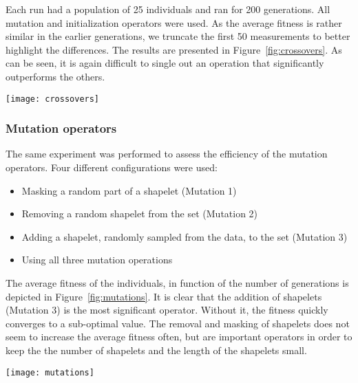 \documentclass[runningheads]{llncs}
\begin{document}
Each run had a population of 25 individuals and ran for 200 generations. All mutation and initialization operators were used. As the average fitness is rather similar in the earlier generations, we truncate the first 50 measurements to better highlight the differences. The results are presented in Figure~\ref{fig:crossovers}. As can be seen, it is again difficult to single out an operation that significantly outperforms the others.

\begin{figure*}
	\centering
	\texttt{[image: crossovers]}
	\caption{The fitness in function of the number of generations, for six datasets, using four different configurations of crossover operations.}
	\label{fig:crossovers}      
\end{figure*}

\subsubsection{Mutation operators}
The same experiment was performed to assess the efficiency of the mutation operators. Four different configurations were used:
\begin{itemize}
	\item Masking a random part of a shapelet (Mutation 1)
	\item Removing a random shapelet from the set (Mutation 2)
	\item Adding a shapelet, randomly sampled from the data, to the set (Mutation 3)
	\item Using all three mutation operations
\end{itemize}
The average fitness of the individuals, in function of the number of generations is depicted in Figure~\ref{fig:mutations}. It is clear that the addition of shapelets (Mutation 3) is the most significant operator. Without it, the fitness quickly converges to a sub-optimal value. The removal and masking of shapelets does not seem to increase the average fitness often, but are important operators in order to keep the the number of shapelets and the length of the shapelets small.

\begin{figure*}
	\centering
	\texttt{[image: mutations]}
	\caption{The fitness in function of the number of generations, for six datasets, using four different configurations of mutation operations.}
	\label{fig:mutations}      
\end{figure*}
\end{document}
